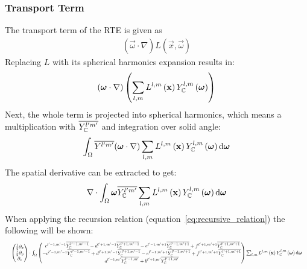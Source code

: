\subsubsection*{Transport Term}
The transport term of the RTE is given as
\begin{align*}
(\vec{\omega}\cdot\nabla)L(\vec{x}, \vec{\omega})
\end{align*}
Replacing $L$ with its spherical harmonics expansion results in:
\begin{align*}
\left(\boldsymbol{\mathbf{\omega}}\cdot\nabla\right)
\left(
\sum_{l,m}
{
L^{l,m}\left(\boldsymbol{\mathbf{x}}\right )
Y_{\mathbb{C}}^{l,m}\left(\boldsymbol{\mathbf{\omega}}\right)
}
\right)
\end{align*}
Next, the whole term is projected into spherical harmonics, which means a multiplication with $\overline{Y_{\mathbb{C}}^{l'm'}}$ and integration over solid angle:
\begin{align*}
\int_\Omega
{
\overline{Y^{l'm'}}(\boldsymbol{\mathbf{\omega}}\cdot\nabla)
\sum_{l,m}
{
L^{l,m}\left(\boldsymbol{\mathbf{x}}\right)
Y_{\mathbb{C}}^{l,m}\left(\boldsymbol{\mathbf{\omega}}\right)
}
}
\,\mathrm{d}\boldsymbol{\mathbf{\omega}}
\end{align*}
The spatial derivative can be extracted to get:
\begin{align*}
\nabla\cdot\int_\Omega
{
\boldsymbol{\mathbf{\omega}}\overline{Y_{\mathbb{C}}^{l'm'}}
\sum_{l,m}
{
L^{l,m}\left(\boldsymbol{\mathbf{x}}\right)
Y_{\mathbb{C}}^{l,m}\left(\boldsymbol{\mathbf{\omega}}\right)
}
\,\mathrm{d}\boldsymbol{\mathbf{\omega}}
}
\end{align*}
When applying the recursion relation (equation~\ref{eq:recursive_relation}) the following will be shown:
\begin{equation*}
\resizebox{1.0\hsize}{!}{$
\begin{pmatrix}
\frac{1}{2}\partial_x\\
\frac{i}{2}\partial_y\\
\partial_z
\end{pmatrix}
\cdot
\int_\Omega
\begin{pmatrix}
\ c^{l'-1, m'-1}\overline{\SHBC^{l'-1,m'-1}} - d^{l'+1, m'-1}\overline{\SHBC^{l'+1,m'-1}} - e^{l'-1, m'+1}\overline{\SHBC^{l'-1,m'+1}} + f^{l'+1, m'+1}\overline{\SHBC^{l'+1,m'+1}}\\
-c^{l'-1, m'-1}\overline{\SHBC^{l'-1,m'-1}} + d^{l'+1, m'-1}\overline{\SHBC^{l'+1,m'-1}} - e^{l'-1, m'+1}\overline{\SHBC^{l'-1,m'+1}} + f^{l'+1, m'+1}\overline{\SHBC^{l'+1,m'+1}} \\
a^{l'-1, m'}\overline{\SHBC^{l'-1,m'}}+b^{l'+1, m'}\overline{\SHBC^{l'+1,m'}}
\end{pmatrix}
\sum_{l,m}{
L^{l,m}\left(\vec{x}\right )\SHBC^{l,m}\left(\vec{\omega}\right)
}
\ud\vec{\omega}
$}
\end{equation*}
